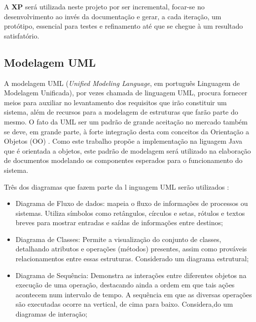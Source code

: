 A \textbf{XP} será utilizada neste projeto por ser incremental, focar-se no desenvolvimento ao invés da documentação e gerar, a cada iteração, um protótipo, essencial para testes e refinamento até que se chegue à um resultado satisfatório.



\subsection{Modelagem UML}\label{subsec:uml}

A modelagem UML (\textit{Unified Modeling Language}, em português Linguagem de Modelagem Unificada), por vezes chamada de linguagem UML, procura fornecer meios para auxiliar no levantamento dos requisitos que irão constituir um sistema, além de recursos para a modelagem de estruturas que farão parte do mesmo. O fato da UML ser um padrão de grande aceitação no mercado também se deve, em grande parte, à forte integração desta com conceitos da Orientação a Objetos (OO) \cite{uml}. Como este trabalho propõe a implementação na liguagem Java que é orientada a objetos, este padrão de modelagem será utilizado na elaboração de documentos modelando os componentes esperados para o funcionamento do sistema.

Três dos diagramas que fazem parte da l inguagem UML serão utilizados \cite{uml}:



\begin{itemize}
	\item Diagrama de Fluxo de dados: mapeia o fluxo de informações de processos ou sistemas. Utiliza símbolos como retângulos, círculos e setas, rótulos e textos breves para mostrar entradas e saídas de informações entre destinos;
	
	\item Diagrama de Classes: Permite a visualização do conjunto de classes, detalhando atributos e operações (métodos) presentes, assim como prováveis relacionamentos entre essas estruturas. Considerado um diagrama estrutural;
	
	\item Diagrama de Sequência: Demonstra as interações entre diferentes objetos na execução de uma operação, destacando ainda a ordem em que tais ações acontecem num intervalo de tempo. A sequência em que as diversas operações são executadas ocorre na vertical, de cima para baixo. Considera,do um diagramas de interação;	
\end{itemize}

